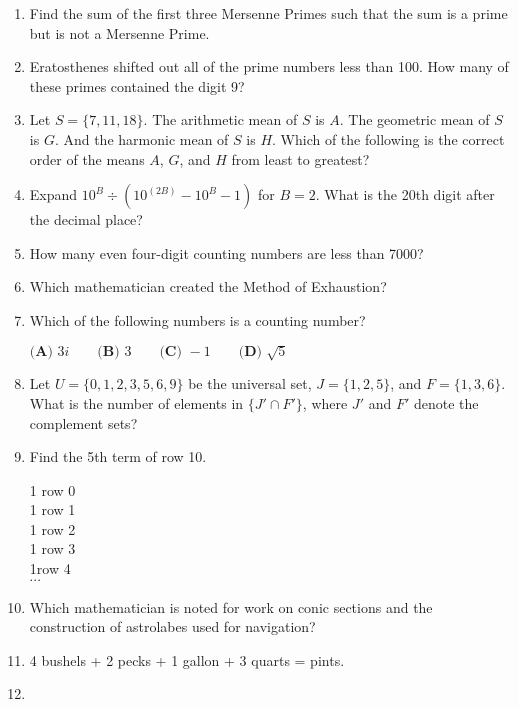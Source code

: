 \documentclass[../uilmath.tex]{subfiles}
\begin{document}
\begin{enumerate}[label=\bfseries\arabic*.]
    \item %
    Find the sum of the first three Mersenne Primes such that the sum is a prime but is not a Mersenne Prime.

    \item %
    Eratosthenes shifted out all of the prime numbers less than 100. How many of these primes contained the digit 9?

    \item %
    Let $S=\{7,11,18\}$. The arithmetic mean of $S$ is $A$. The geometric mean of $S$ is $G$. And the harmonic mean of $S$ is $H$.
    Which of the following is the correct order of the means $A$, $G$, and $H$ from least to greatest?

    \item %
    Expand $10^B \div (10^{(2B)}-10^B-1)$ for $B=2$. What is the 20th digit after the decimal place?

    \item %
    How many even four-digit counting numbers are less than 7000?

    \item %
    Which mathematician created the Method of Exhaustion?

    \item %
    Which of the following numbers is a counting number?

    $\textbf{(A) } 3i \qquad \textbf{(B) } 3 \qquad \textbf{(C) } -1 \qquad \textbf{(D) } \sqrt{5}$

    \item %
    Let $U=\{0,1,2,3,5,6,9\}$ be the universal set, $J=\{1,2,5\}$, and $F=\{1,3,6\}$. What is the number of elements in $\{J' \cap F'\}$, where $J'$ and $F'$ denote the complement sets?

    \item %
    Find the 5th term of row 10.
    \begin{center}
        1 \qquad row 0\\
        1  \qquad row 1\\
        1   \qquad row 2\\
        1    \qquad row 3\\
        1\qquad row 4\\
        $\cdots$ 
    \end{center}

    \item %
    Which mathematician is noted for work on conic sections and the construction of astrolabes used for navigation?

    \item %
    4 bushels + 2 pecks + 1 gallon + 3 quarts = \blank pints.

    \item %
    
\end{enumerate}
\end{document}
